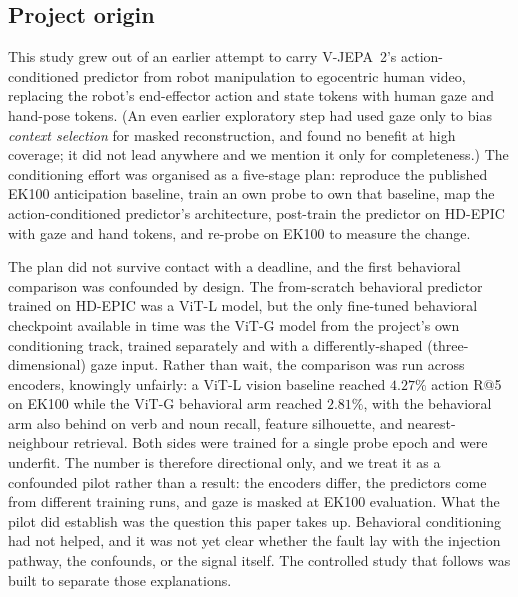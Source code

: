 \subsection{Project origin}
\label{subsec:bg-origin}

This study grew out of an earlier attempt to carry V-JEPA~2's action-conditioned
predictor from robot manipulation to egocentric human video, replacing the
robot's end-effector action and state tokens with human gaze and hand-pose
tokens. (An even earlier exploratory step had used gaze only to bias
\emph{context selection} for masked reconstruction, and found no benefit at high
coverage; it did not lead anywhere and we mention it only for completeness.) The
conditioning effort was organised as a five-stage plan: reproduce the published
EK100 anticipation baseline, train an own probe to own that baseline, map the
action-conditioned predictor's architecture, post-train the predictor on HD-EPIC
with gaze and hand tokens, and re-probe on EK100 to measure the change.

The plan did not survive contact with a deadline, and the first behavioral
comparison was confounded by design. The from-scratch behavioral predictor
trained on HD-EPIC was a ViT-L model, but the only fine-tuned
behavioral checkpoint available in time was the ViT-G model from the project's
own conditioning track, trained separately and with a differently-shaped
(three-dimensional) gaze input. Rather than wait, the comparison
was run across encoders, knowingly unfairly: a ViT-L vision baseline reached
$4.27\%$ action R@5 on EK100 while the ViT-G behavioral arm reached $2.81\%$, with
the behavioral arm also behind on verb and noun recall, feature silhouette, and
nearest-neighbour retrieval. Both sides were trained for a single probe epoch and
were underfit. The number is therefore directional only, and we treat it as a
confounded pilot rather than a result: the encoders differ, the predictors come
from different training runs, and gaze is masked at EK100 evaluation. What the
pilot did establish was the question this paper takes up. Behavioral conditioning
had not helped, and it was not yet clear whether the fault lay with the injection
pathway, the confounds, or the signal itself. The controlled study that follows
was built to separate those explanations.
